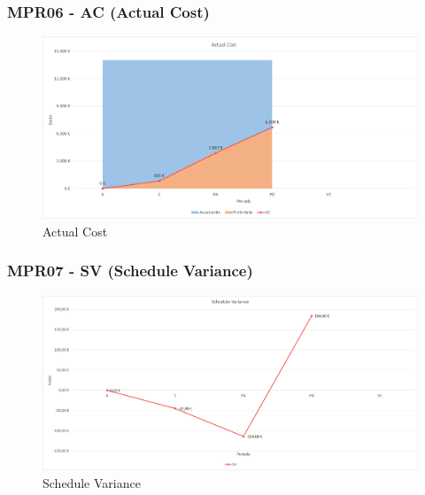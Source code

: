 \subsubsection{MPR06 - AC (Actual Cost)}
\begin{figure}[!ht]
    \caption{Actual Cost}
    \vspace{10px}
    \includegraphics[scale=0.5]{sezioni/immagini/ActualCost.png}
    \centering
\end{figure}
\subsubsection{MPR07 - SV (Schedule Variance)}
\begin{figure}[!ht]
    \caption{Schedule Variance}
    \vspace{10px}
    \includegraphics[scale=0.5]{sezioni/immagini/ScheduleVariance.png}
    \centering
\end{figure}
